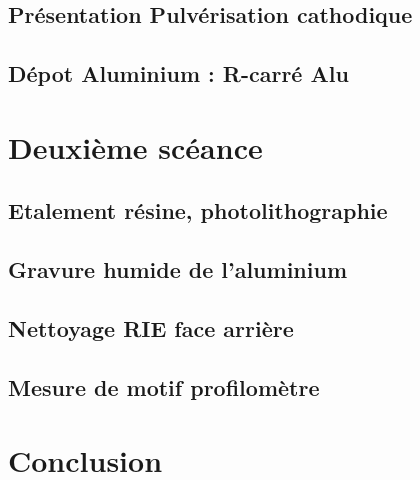 \documentclass[11pt]{article}
\begin{document}
\subsection{Pr\'esentation Pulv\'erisation cathodique}

\subsection{D\'epot Aluminium : R-carr\'e Alu }

\section{Deuxi\`eme sc\'eance}

\subsection{Etalement r\'esine, photolithographie}

\subsection{Gravure humide de l'aluminium}

\subsection{Nettoyage RIE face arri\`ere}

\subsection{Mesure de motif profilom\`etre}


\section{Conclusion}
\end{document}
